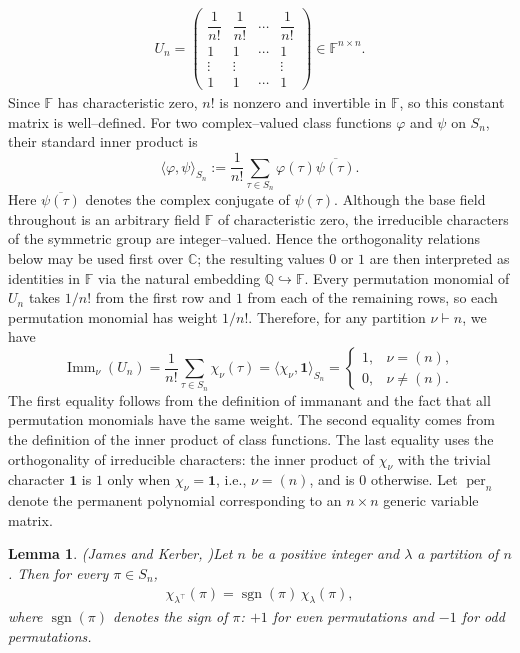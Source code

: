 \documentclass[11pt,a4paper]{article}
\newtheorem{lemma}[theorem]{Lemma}
\begin{document}
\begin{eqnarray*}
  U_n=
  \begin{pmatrix}
    \dfrac1{n!}&\dfrac1{n!}&\cdots&\dfrac1{n!}\\
    1&1&\cdots&1\\
    \vdots&\vdots&&\vdots\\
    1&1&\cdots&1
  \end{pmatrix}\in\mathbb{F}^{n\times n}.
\end{eqnarray*}
Since $\mathbb{F}$ has characteristic zero, $n!$ is nonzero and invertible in $\mathbb{F}$, so this constant matrix is well–defined. For two complex–valued class functions $\varphi$ and $\psi$ on $S_n$, their standard inner product is
\[
  \langle\varphi,\psi\rangle_{S_n}
  :=\frac1{n!}\sum_{\tau\in S_n}
  \varphi(\tau)\overline{\psi(\tau)}.
\]
Here $\overline{\psi(\tau)}$ denotes the complex conjugate of $\psi(\tau)$. Although the base field throughout is an arbitrary field $\mathbb{F}$ of characteristic zero, the irreducible characters of the symmetric group are integer–valued. Hence the orthogonality relations below may be used first over $\mathbb{C}$; the resulting values $0$ or $1$ are then interpreted as identities in $\mathbb{F}$ via the natural embedding $\mathbb{Q}\hookrightarrow\mathbb{F}$. Every permutation monomial of $U_n$ takes $1/n!$ from the first row and $1$ from each of the remaining rows, so each permutation monomial has weight $1/n!$. Therefore, for any partition $\nu\vdash n$, we have
\begin{equation}\label{equ5}
  \operatorname{Imm}_\nu(U_n)
  =\frac1{n!}\sum_{\tau\in S_n}\chi_{\nu}(\tau)
  =\langle\chi_{\nu},\mathbf{1}\rangle_{S_n}
  =\begin{cases}
    1,&\nu=(n),\\
    0,&\nu\ne(n).
  \end{cases}
\end{equation}
The first equality follows from the definition of immanant and the fact that all permutation monomials have the same weight. The second equality comes from the definition of the inner product of class functions. The last equality uses the orthogonality of irreducible characters: the inner product of $\chi_\nu$ with the trivial character $\mathbf{1}$ is $1$ only when $\chi_\nu=\mathbf{1}$, i.e., $\nu=(n)$, and is $0$ otherwise.
Let $\operatorname{per}_n$ denote the permanent polynomial corresponding to an $n\times n$ generic variable matrix.

\begin{lemma}(James and Kerber, \cite{jam})\label{lem2.01}
Let $n$ be a positive integer and $\lambda$ a partition of $n$. Then for every $\pi\in S_n$,
\begin{eqnarray*}
\chi_{\lambda^\top}(\pi) = \operatorname{sgn}(\pi) \, \chi_{\lambda}(\pi),
\end{eqnarray*}
where $\operatorname{sgn}(\pi)$ denotes the sign of $\pi$: $+1$ for even permutations and $-1$ for odd permutations.
\end{lemma}
\end{document}
